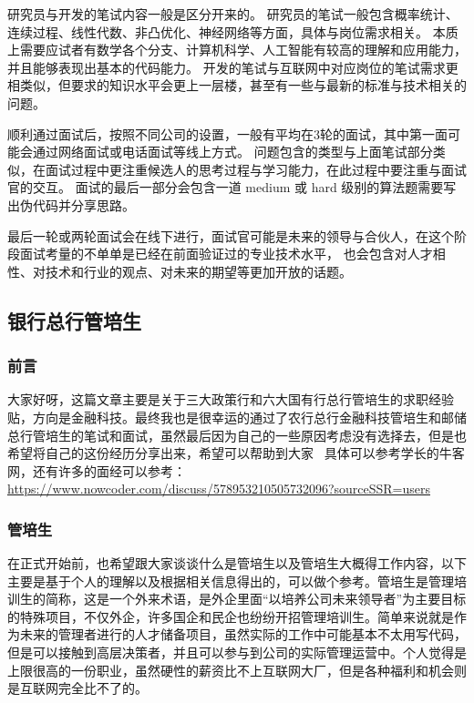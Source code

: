 研究员与开发的笔试内容一般是区分开来的。
研究员的笔试一般包含概率统计、连续过程、线性代数、非凸优化、神经网络等方面，具体与岗位需求相关。
本质上需要应试者有数学各个分支、计算机科学、人工智能有较高的理解和应用能力，并且能够表现出基本的代码能力。
开发的笔试与互联网中对应岗位的笔试需求更相类似，但要求的知识水平会更上一层楼，甚至有一些与最新的标准与技术相关的问题。

顺利通过面试后，按照不同公司的设置，一般有平均在3轮的面试，其中第一面可能会通过网络面试或电话面试等线上方式。
问题包含的类型与上面笔试部分类似，在面试过程中更注重候选人的思考过程与学习能力，在此过程中要注重与面试官的交互。
面试的最后一部分会包含一道 medium 或 hard 级别的算法题需要写出伪代码并分享思路。

最后一轮或两轮面试会在线下进行，面试官可能是未来的领导与合伙人，在这个阶段面试考量的不单单是已经在前面验证过的专业技术水平，
也会包含对人才相性、对技术和行业的观点、对未来的期望等更加开放的话题。


\subsection{银行总行管培生}
\subsubsection{前言}

大家好呀，这篇文章主要是关于三大政策行和六大国有行总行管培生的求职经验贴，方向是金融科技。最终我也是很幸运的通过了农行总行金融科技管培生和邮储总行管培生的笔试和面试，虽然最后因为自己的一些原因考虑没有选择去，但是也希望将自己的这份经历分享出来，希望可以帮助到大家~
具体可以参考学长的牛客网，还有许多的面经可以参考：\url{https://www.nowcoder.com/discuss/578953210505732096?sourceSSR=users}

\subsubsection{管培生}

在正式开始前，也希望跟大家谈谈什么是管培生以及管培生大概得工作内容，以下主要是基于个人的理解以及根据相关信息得出的，可以做个参考。管培生是管理培训生的简称，这是一个外来术语，是外企里面“以培养公司未来领导者”为主要目标的特殊项目，不仅外企，许多国企和民企也纷纷开招管理培训生。简单来说就是作为未来的管理者进行的人才储备项目，虽然实际的工作中可能基本不太用写代码，但是可以接触到高层决策者，并且可以参与到公司的实际管理运营中。个人觉得是上限很高的一份职业，虽然硬性的薪资比不上互联网大厂，但是各种福利和机会则是互联网完全比不了的。

